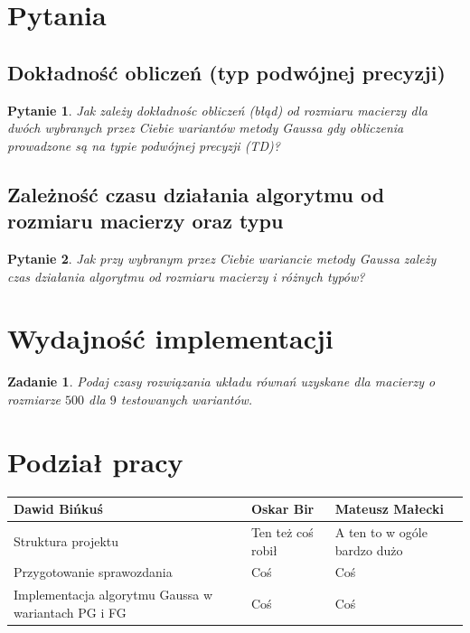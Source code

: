 \documentclass[10pt]{article}
\newtheorem{que}{Pytanie}
\newtheorem{wyd}{Zadanie}
\begin{document}
\section{Pytania}
\subsection{Dokładność obliczeń (typ podwójnej precyzji)}
\begin{que}
	Jak zależy dokładnośc obliczeń (błąd) od rozmiaru macierzy dla dwóch wybranych
	przez Ciebie wariantów metody Gaussa gdy obliczenia prowadzone są na typie
	podwójnej precyzji (TD)?\label{que:1}
\end{que}
\subsection{Zależność czasu działania algorytmu od rozmiaru macierzy oraz typu}
\begin{que}
	 Jak przy wybranym przez Ciebie wariancie metody Gaussa zależy czas działania
	algorytmu od rozmiaru macierzy i różnych typów?\label{que:2}
\end{que}
\section{Wydajność implementacji}
\begin{wyd}
	Podaj czasy rozwiązania układu równań uzyskane dla macierzy o rozmiarze $500$ dla $9$ testowanych wariantów.
\end{wyd}
\section{Podział pracy}
\begin{center}
	\begin{tabular}{| l | l | l |}
		\hline
		\textbf{Dawid Bińkuś} & \textbf{Oskar Bir} & \textbf{Mateusz Małecki} \\ \hline
		Struktura projektu & Ten też coś robił & A ten to w ogóle bardzo dużo \\ \hline
		Przygotowanie sprawozdania & Coś & Coś\\ \hline
		Implementacja algorytmu Gaussa w wariantach PG i FG & Coś & Coś \\ \hline
		
		
	\end{tabular}
\end{center}
\end{document}
